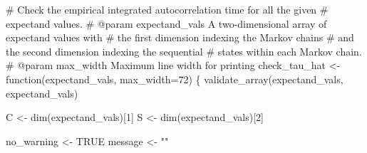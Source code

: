 \documentclass[
  letterpaper,
  DIV=11,
  numbers=noendperiod]{scrartcl}
\newenvironment{Shaded}{\begin{snugshade}}{\end{snugshade}}
\newcommand{\CommentTok}[1]{\textcolor[rgb]{0.37,0.37,0.37}{#1}}
\newcommand{\DecValTok}[1]{\textcolor[rgb]{0.68,0.00,0.00}{#1}}
\newcommand{\NormalTok}[1]{\textcolor[rgb]{0.00,0.23,0.31}{#1}}
\newcommand{\OperatorTok}[1]{\textcolor[rgb]{0.37,0.37,0.37}{#1}}
\newcommand{\StringTok}[1]{\textcolor[rgb]{0.13,0.47,0.30}{#1}}
\begin{document}
\begin{Shaded}
\begin{Highlighting}[]
\CommentTok{\# Check the empirical integrated autocorrelation time for all the given}
\CommentTok{\# expectand values.}
\CommentTok{\# @param expectand\_vals A two{-}dimensional array of expectand values with}
\CommentTok{\#                       the first dimension indexing the Markov chains}
\CommentTok{\#                       and the second dimension indexing the sequential}
\CommentTok{\#                       states within each Markov chain.}
\CommentTok{\# @param max\_width Maximum line width for printing}
\NormalTok{check\_tau\_hat }\OperatorTok{\textless{}{-}}\NormalTok{ function(expectand\_vals,}
\NormalTok{                          max\_width}\OperatorTok{=}\DecValTok{72}\NormalTok{) \{}
\NormalTok{  validate\_array(expectand\_vals, }\StringTok{\textquotesingle{}expectand\_vals\textquotesingle{}}\NormalTok{)}

\NormalTok{  C }\OperatorTok{\textless{}{-}}\NormalTok{ dim(expectand\_vals)[}\DecValTok{1}\NormalTok{]}
\NormalTok{  S }\OperatorTok{\textless{}{-}}\NormalTok{ dim(expectand\_vals)[}\DecValTok{2}\NormalTok{]}

\NormalTok{  no\_warning }\OperatorTok{\textless{}{-}}\NormalTok{ TRUE}
\NormalTok{  message }\OperatorTok{\textless{}{-}} \StringTok{""}


\end{Highlighting}
\end{Shaded}
\end{document}
